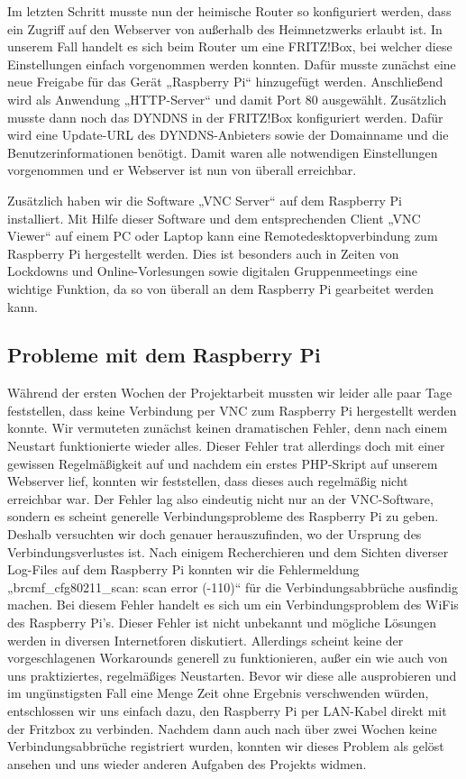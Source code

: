 Im letzten Schritt musste nun der heimische Router so konfiguriert werden, dass ein Zugriff auf den Webserver von außerhalb des Heimnetzwerks erlaubt ist. In unserem Fall handelt es sich beim Router um eine FRITZ!Box, bei welcher diese Einstellungen einfach vorgenommen werden konnten.  Dafür musste zunächst eine neue Freigabe für das Gerät „Raspberry Pi“ hinzugefügt werden. Anschließend wird als Anwendung „HTTP-Server“ und damit Port 80 ausgewählt. Zusätzlich musste dann noch das DYNDNS in der FRITZ!Box konfiguriert werden. Dafür wird eine Update-URL des DYNDNS-Anbieters sowie der Domainname und die Benutzerinformationen benötigt. Damit waren alle notwendigen Einstellungen vorgenommen und er Webserver ist nun von überall erreichbar.

Zusätzlich haben wir die Software „VNC Server“ auf dem Raspberry Pi installiert. Mit Hilfe dieser Software und dem entsprechenden Client „VNC Viewer“ auf einem PC oder Laptop kann eine Remotedesktopverbindung zum Raspberry Pi hergestellt werden. Dies ist besonders auch in Zeiten von Lockdowns und Online-Vorlesungen sowie digitalen Gruppenmeetings eine wichtige Funktion, da so von überall an dem Raspberry Pi gearbeitet werden kann.

\subsection{Probleme mit dem Raspberry Pi}
Während der ersten Wochen der Projektarbeit mussten wir leider alle paar Tage feststellen, dass keine Verbindung per VNC zum Raspberry Pi hergestellt werden konnte. Wir vermuteten zunächst keinen dramatischen Fehler, denn nach einem Neustart funktionierte wieder alles. Dieser Fehler trat allerdings doch mit einer gewissen Regelmäßigkeit auf und nachdem ein erstes PHP-Skript auf unserem Webserver lief, konnten wir feststellen, dass dieses auch regelmäßig nicht erreichbar war. Der Fehler lag also eindeutig nicht nur an der VNC-Software, sondern es scheint generelle Verbindungsprobleme des Raspberry Pi zu geben.
Deshalb versuchten wir doch genauer herauszufinden, wo der Ursprung des Verbindungsverlustes ist. Nach einigem Recherchieren und dem Sichten diverser Log-Files auf dem Raspberry Pi konnten wir die Fehlermeldung „brcmf\_cfg80211\_scan: scan error (-110)“ für die Verbindungsabbrüche ausfindig machen. Bei diesem Fehler handelt es sich um ein Verbindungsproblem des WiFis des Raspberry Pi’s. Dieser Fehler ist nicht unbekannt und mögliche Lösungen werden in diversen Internetforen diskutiert. Allerdings scheint keine der vorgeschlagenen Workarounds generell zu funktionieren, außer ein wie auch von uns praktiziertes, regelmäßiges Neustarten. Bevor wir diese alle ausprobieren und im ungünstigsten Fall eine Menge Zeit ohne Ergebnis verschwenden würden, entschlossen wir uns einfach dazu, den Raspberry Pi per LAN-Kabel direkt mit der Fritzbox zu verbinden. Nachdem dann auch nach über zwei Wochen keine Verbindungsabbrüche registriert wurden, konnten wir dieses Problem als gelöst ansehen und uns wieder anderen Aufgaben des Projekts widmen.

